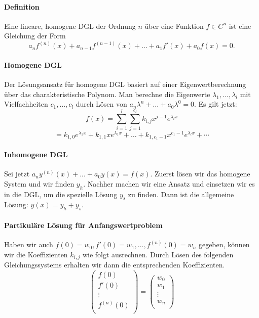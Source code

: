 \documentclass[a4paper, 9pt, DIV=24]{scrartcl}
\begin{document}
\paragraph{Definition} Eine lineare, homogene DGL der Ordnung $n$ über eine Funktion $f \in C^{n}$ ist eine Gleichung der Form
\[ a_n f^{(n)}(x) + a_{n-1} f^{(n-1)}(x) + \dots + a_1 f'(x) + a_0 f(x) = 0. \]
\paragraph{Homogene DGL}
Der Lösungsansatz für homogene DGL basiert auf einer Eigenwertberechnung über das charakteristische Polynom.
Man berechne die Eigenwerte $\lambda_1, \dots, \lambda_l$ mit Vielfachheiten $c_1, \dots, c_l$ durch Lösen von $a_n\lambda^n + \dots + a_0\lambda^0 = 0$.
Es gilt jetzt:
\[ f(x) = \sum_{i=1}^{l}\sum_{j=1}^{c_l}k_{i,j}x^{j-1}e^{\lambda_l x} \]
\[ = k_{1,0}e^{\lambda_1 x} + k_{1,1}xe^{\lambda_1 x} + \dots + k_{1,c_1-1}x^{c_1-1}e^{\lambda_l x} + \cdots \]

\paragraph{Inhomogene DGL}
Sei jetzt $a_n y^{(n)}(x)+...+a_0 y(x) = f(x)$. Zuerst lösen wir das homogene System und wir finden $y_h$. Nachher machen wir eine Ansatz und einsetzen wir es in die DGL, um die spezielle Lösung $y_s$ zu finden. Dann ist die allgemeine Lösung: $y(x)=y_h+y_s$.
 
\paragraph{Partikuläre Lösung für Anfangswertproblem}
Haben wir auch $f(0) = w_0, f'(0) = w_1, \dots, f^{(n)}(0) = w_n$ gegeben,
können wir die Koeffizienten $k_{i,j}$ wie folgt ausrechnen.
Durch Lösen des folgenden Gleichungssystems erhalten wir dann die entsprechenden Koeffizienten.
\[
 \begin{pmatrix}
  f(0) \\
  f'(0) \\
  \vdots \\
  f^{(n)}(0) \\
 \end{pmatrix}
  =
 \begin{pmatrix}
  w_0 \\
  w_1 \\
  \vdots \\
  w_n \\
 \end{pmatrix}
\]
\end{document}
